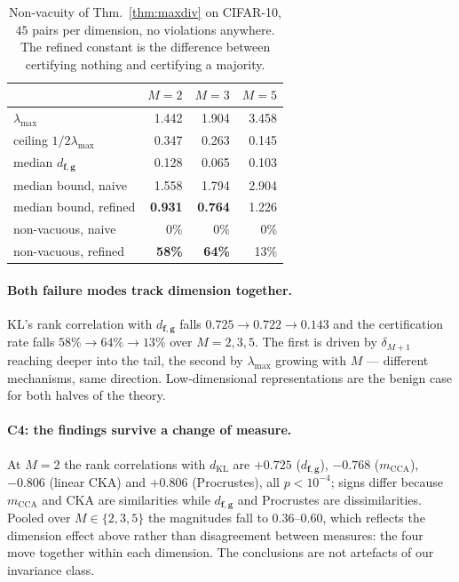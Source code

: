 \documentclass[10pt,letterpaper,twocolumn]{article}
\newcommand{\bff}{\mathbf{f}}
\newcommand{\bfg}{\mathbf{g}}
\newcommand{\dKL}{d_{\mathrm{KL}}}
\newcommand{\dfg}{d_{\bff,\bfg}}
\newcommand{\mCCA}{m_{\mathrm{CCA}}}
\theoremstyle{plain}
\theoremstyle{definition}
\theoremstyle{remark}
\begin{document}
\begin{table}[t]
\centering\small
\caption{Non-vacuity of Thm.~\ref{thm:maxdiv} on CIFAR-10, $45$ pairs per
dimension, no violations anywhere. The refined constant is the difference
between certifying nothing and certifying a majority.}
\label{tab:c3}
\begin{tabular}{@{}lrrr@{}}
\toprule
 & $M{=}2$ & $M{=}3$ & $M{=}5$ \\
\midrule
$\lambda_{\max}$            & 1.442 & 1.904 & 3.458 \\
ceiling $1/2\lambda_{\max}$ & 0.347 & 0.263 & 0.145 \\
median $\dfg$               & 0.128 & 0.065 & 0.103 \\
median bound, naive         & 1.558 & 1.794 & 2.904 \\
median bound, refined       & \textbf{0.931} & \textbf{0.764} & 1.226 \\
non-vacuous, naive          & 0\% & 0\% & 0\% \\
non-vacuous, refined        & \textbf{58\%} & \textbf{64\%} & 13\% \\
\bottomrule
\end{tabular}
\end{table}

\paragraph{Both failure modes track dimension together.}
KL's rank correlation with $\dfg$ falls $0.725\to0.722\to0.143$ and the
certification rate falls $58\%\to64\%\to13\%$ over $M=2,3,5$. The first is
driven by $\delta_{M+1}$ reaching deeper into the tail, the second by
$\lambda_{\max}$ growing with $M$ --- different mechanisms, same direction.
Low-dimensional representations are the benign case for both halves of the
theory.

\paragraph{C4: the findings survive a change of measure.}
At $M{=}2$ the rank correlations with $\dKL$ are $+0.725$ ($\dfg$), $-0.768$
($\mCCA$), $-0.806$ (linear CKA) and $+0.806$ (Procrustes), all $p<10^{-4}$;
signs differ because $\mCCA$ and CKA are similarities while $\dfg$ and
Procrustes are dissimilarities. Pooled over $M\in\{2,3,5\}$ the magnitudes fall
to $0.36$--$0.60$, which reflects the dimension effect above rather than
disagreement between measures: the four move together within each dimension.
The conclusions are not artefacts of our invariance class.
\end{document}
